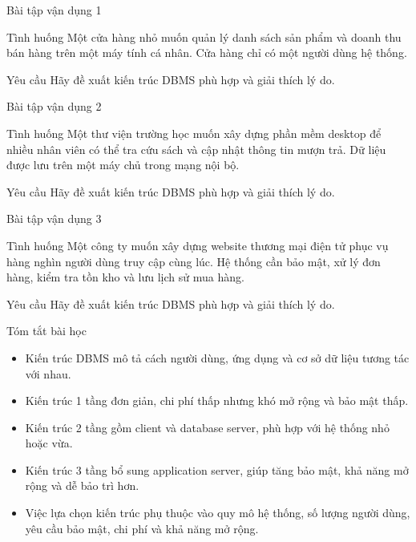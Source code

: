 \documentclass[aspectratio=169,11pt]{beamer}
\newcommand{\tightlist}{\setlength{\itemsep}{2pt}\setlength{\parskip}{0pt}}
\begin{document}
\begin{frame}{Bài tập vận dụng 1}
\small
\begin{block}{Tình huống}
Một cửa hàng nhỏ muốn quản lý danh sách sản phẩm và doanh thu bán hàng trên một máy tính cá nhân. Cửa hàng chỉ có một người dùng hệ thống.
\end{block}

\begin{exampleblock}{Yêu cầu}
Hãy đề xuất kiến trúc DBMS phù hợp và giải thích lý do.
\end{exampleblock}
\end{frame}

\begin{frame}{Bài tập vận dụng 2}
\small
\begin{block}{Tình huống}
Một thư viện trường học muốn xây dựng phần mềm desktop để nhiều nhân viên có thể tra cứu sách và cập nhật thông tin mượn trả. Dữ liệu được lưu trên một máy chủ trong mạng nội bộ.
\end{block}

\begin{exampleblock}{Yêu cầu}
Hãy đề xuất kiến trúc DBMS phù hợp và giải thích lý do.
\end{exampleblock}
\end{frame}

\begin{frame}{Bài tập vận dụng 3}
\small
\begin{block}{Tình huống}
Một công ty muốn xây dựng website thương mại điện tử phục vụ hàng nghìn người dùng truy cập cùng lúc. Hệ thống cần bảo mật, xử lý đơn hàng, kiểm tra tồn kho và lưu lịch sử mua hàng.
\end{block}

\begin{exampleblock}{Yêu cầu}
Hãy đề xuất kiến trúc DBMS phù hợp và giải thích lý do.
\end{exampleblock}
\end{frame}

\begin{frame}{Tóm tắt bài học}
\small
\begin{itemize}
\tightlist
  \item Kiến trúc DBMS mô tả cách người dùng, ứng dụng và cơ sở dữ liệu tương tác với nhau.
  \item Kiến trúc 1 tầng đơn giản, chi phí thấp nhưng khó mở rộng và bảo mật thấp.
  \item Kiến trúc 2 tầng gồm client và database server, phù hợp với hệ thống nhỏ hoặc vừa.
  \item Kiến trúc 3 tầng bổ sung application server, giúp tăng bảo mật, khả năng mở rộng và dễ bảo trì hơn.
  \item Việc lựa chọn kiến trúc phụ thuộc vào quy mô hệ thống, số lượng người dùng, yêu cầu bảo mật, chi phí và khả năng mở rộng.
\end{itemize}
\end{frame}
\end{document}
